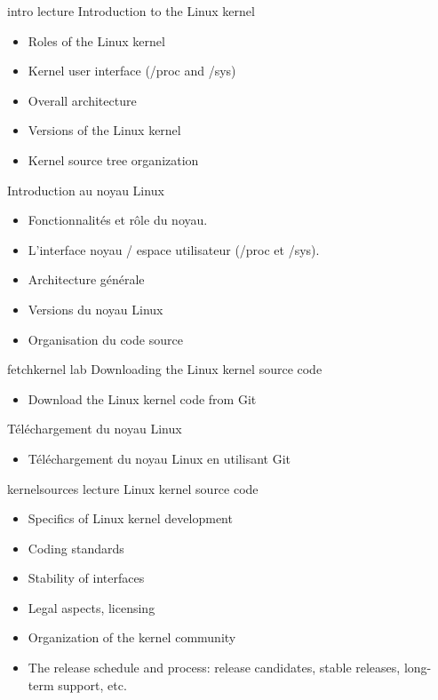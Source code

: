 \def \trainers {gregory-clement,maxime-chevallier,miquel-raynal,theo-lebrun}

\def \onsitelecturetimeratio{50}
\def \onsitelabtimeratio{50}


{intro}
{lecture}
{Introduction to the Linux kernel}
{
  \begin{itemize}
  \item Roles of the Linux kernel
  \item Kernel user interface (/proc and /sys)
  \item Overall architecture
  \item Versions of the Linux kernel
  \item Kernel source tree organization
  \end{itemize}
}
{Introduction au noyau Linux}
{
  \begin{itemize}
  \item Fonctionnalités et rôle du noyau.
  \item L'interface noyau / espace utilisateur (/proc et /sys).
  \item Architecture générale
  \item Versions du noyau Linux
  \item Organisation du code source
  \end{itemize}
}
{fetchkernel}
{lab}
{Downloading the Linux kernel source code}
{
  \begin{itemize}
  \item Download the Linux kernel code from Git
  \end{itemize}
}
{Téléchargement du noyau Linux}
{
  \begin{itemize}
  \item Téléchargement du noyau Linux en utilisant Git
  \end{itemize}
}
{kernelsources}
{lecture}
{Linux kernel source code}
{
  \begin{itemize}
  \item Specifics of Linux kernel development
  \item Coding standards
  \item Stability of interfaces
  \item Legal aspects, licensing
  \item Organization of the kernel community
  \item The release schedule and process: release candidates, stable
    releases, long-term support, etc.
  \end{itemize}
}
